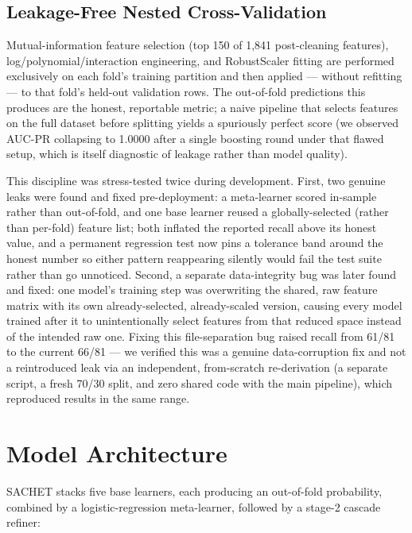 \documentclass{article}
\begin{document}
\subsection{Leakage-Free Nested Cross-Validation}
\label{ssec:subhead}

Mutual-information feature selection (top 150 of 1{,}841 post-cleaning features),
log/polynomial/interaction engineering, and RobustScaler fitting are performed
exclusively on each fold's training partition and then applied --- without refitting
--- to that fold's held-out validation rows. The out-of-fold predictions this produces
are the honest, reportable metric; a naive pipeline that selects features on the full
dataset before splitting yields a spuriously perfect score (we observed AUC-PR
collapsing to 1.0000 after a single boosting round under that flawed setup, which is
itself diagnostic of leakage rather than model quality).

This discipline was stress-tested twice during development. First, two genuine leaks
were found and fixed pre-deployment: a meta-learner scored in-sample rather than
out-of-fold, and one base learner reused a globally-selected (rather than per-fold)
feature list; both inflated the reported recall above its honest value, and a permanent
regression test now pins a tolerance band around the honest number so either pattern
reappearing silently would fail the test suite rather than go unnoticed. Second, a
separate data-integrity bug was later found and fixed: one model's training step was
overwriting the shared, raw feature matrix with its own already-selected, already-scaled
version, causing every model trained after it to unintentionally select features from
that reduced space instead of the intended raw one. Fixing this file-separation bug
raised recall from 61/81 to the current 66/81 --- we verified this was a genuine
data-corruption fix and not a reintroduced leak via an independent, from-scratch
re-derivation (a separate script, a fresh 70/30 split, and zero shared code with the
main pipeline), which reproduced results in the same range.

\section{Model Architecture}
\label{sec:majhead}

SACHET stacks five base learners, each producing an out-of-fold probability, combined
by a logistic-regression meta-learner, followed by a stage-2 cascade refiner:
\end{document}
